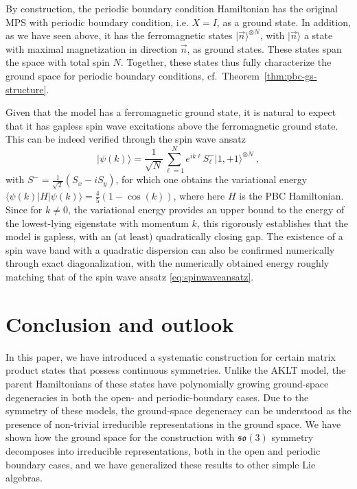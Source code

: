 \documentclass[a4paper]{article}
\newcommand{\ket}[1]{\vert #1 \rangle}
\newcommand{\bra}[1]{\langle #1 \vert}
\newcommand{\so}{\mathfrak{so}}
\theoremstyle{definition}
\begin{document}
By construction, the periodic boundary condition Hamiltonian has the original
MPS with periodic boundary condition, i.e. $X = I$, as a ground state. In addition, as we have seen above, it has the
ferromagnetic states $\ket{\vec n}^{\otimes N}$, with $\ket{\vec n}$ a state with
maximal magnetization in direction $\vec n$, as ground states. These states span the
space with total spin $N$. Together, these states thus fully characterize the
ground space for periodic boundary conditions, cf.\ Theorem~\ref{thm:pbc-gs-structure}.

Given that the model has a ferromagnetic ground state, it is natural to expect
that it has gapless spin wave excitations above the ferromagnetic ground state.
This can be indeed verified through the spin wave ansatz
\begin{equation}
    \label{eq:spinwaveansatz}
\ket{\psi(k)}  = \frac{1}{\sqrt{N}}\sum_{\ell=1}^N e^{ik\ell} S_\ell^-\ket{1,+1}^{\otimes N}\ ,
\end{equation}
with $S^-=\tfrac{1}{\sqrt{2}}(S_x-iS_y)$, for which one obtains the variational
energy  $\bra{\psi(k)} H \ket{\psi(k)} = \tfrac45(1-\cos(k))$, where here $H$
is the PBC Hamiltonian. Since for $k\ne0$, the variational energy provides an
upper bound to the energy of the lowest-lying eigenstate with momentum $k$, this
rigorously establishes that the model is gapless, with an (at least)
quadratically closing gap. The existence of a spin wave band with a quadratic
dispersion can also be confirmed numerically through exact diagonalization, with
the numerically obtained energy roughly matching that of the spin wave ansatz
\eqref{eq:spinwaveansatz}.


\section{Conclusion and outlook}\label{sec:conclusion}

In this paper, we have introduced a systematic construction for certain matrix product states that possess continuous symmetries. Unlike the AKLT model, the parent Hamiltonians of these states have polynomially growing ground-space degeneracies in both the open- and periodic-boundary cases. Due to the symmetry of these models, the ground-space degeneracy can be understood as the presence of non-trivial irreducible representations in the ground space. We have shown how the ground space for the construction with $\so(3)$ symmetry decomposes into irreducible representations, both in the open and periodic boundary cases, and we have generalized these results to other simple Lie algebras.
\end{document}
